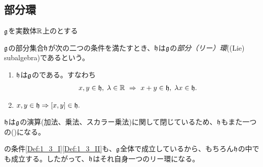 \documentclass[../main]{subfiles}
\begin{document}

\subsection{部分環}
$\mathfrak{g}$を実数体$\mathbb{R}$上の{}とする

\begin{definition}[部分リー環]\label{Def:2_1}
  $\mathfrak{g}$の部分集合$\mathfrak{h}$が次の二つの条件を満たすとき、$\mathfrak{h}$は$\mathfrak{g}$の\emph{部分（リー）環}((Lie) subalgebra)であるという。
  \begin{enumerate}[label=(\roman*)]
    \item \label{Def:2_1_i}$\mathfrak{h}$は$\mathfrak{g}$の{}である。すなわち
      \begin{align*}
        x,y\in\mathfrak{h},\;\lambda\in\mathbb{R}~\Rightarrow~ x+y\in\mathfrak{h},\;\lambda x\in\mathfrak{h}.
      \end{align*}
    \item \label{Def:2_1_ii}$x,y\in\h\Rightarrow\comm{x}{y}\in\h.$
  \end{enumerate}
\end{definition}

\begin{remark}
  $\mathfrak{h}$は$\mathfrak{g}$の演算(加法、乗法、スカラー乗法)に関して閉じているため、$\mathfrak{h}$もまた一つの{\環}({})になる。
\end{remark}
\begin{remark}
  {}の条件\ref{Def:1_3_I}\ref{Def:1_3_II}も、$\mathfrak{g}$全体で成立しているから、もちろん$\mathfrak{h}$の中でも成立する。したがって、$\mathfrak{h}$はそれ自身一つのリー環になる。
\end{remark}
\end{document}
